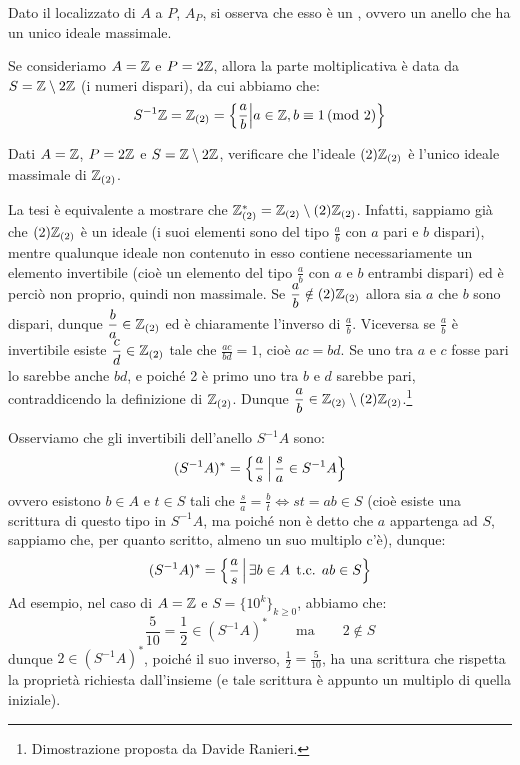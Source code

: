 \documentclass[11pt]{scrartcl}
\begin{document}
\begin{remark}
    Dato il localizzato di $A$ a $P$, $A_P$, si osserva che esso è un , ovvero un anello che ha un unico ideale massimale.
\end{remark}

\begin{example}
    Se consideriamo $A = \mathbb Z$ e $P = 2\mathbb Z$, allora la parte moltiplicativa è data da $S = \mathbb Z\setminus 2\mathbb Z$ (i numeri dispari), da cui abbiamo che:
    \[ S^{-1}\mathbb Z = \mathbb Z_{(2)} = \left\{\frac{a}{b} \middle| a \in \mathbb Z, b \equiv 1 \, \text{(mod 2)}\right\}
        \]
\end{example}

\begin{exercise}
    Dati $A = \mathbb Z$, $P = 2\mathbb Z$ e $S = \mathbb Z\setminus 2\mathbb Z$, verificare che l'ideale $(2)\mathbb Z_{(2)}$ è l'unico ideale massimale di $\mathbb Z_{(2)}$.
\end{exercise}

\begin{soln}
    La tesi è equivalente a mostrare che $\mathbb Z_{(2)}^*=\mathbb Z_{(2)}\setminus (2)\mathbb Z_{(2)}$. 
    Infatti, sappiamo già che $(2)\mathbb Z_{(2)}$ è un ideale (i suoi elementi sono del tipo $\frac{a}{b}$ con $a$ pari e $b$ dispari), 
    mentre qualunque ideale non contenuto in esso contiene necessariamente un elemento invertibile (cioè un elemento del tipo $\frac{a}{b}$ con $a$ e $b$ entrambi dispari) ed è perciò non proprio, quindi non massimale.
    Se $\displaystyle\frac{a}{b}\notin (2)\mathbb Z_{(2)}$ allora sia $a$ che $b$ sono dispari, dunque $\displaystyle\frac{b}{a}\in\mathbb Z_{(2)}$ ed è chiaramente l'inverso di $\displaystyle\frac{a}{b}$.
    Viceversa se $\displaystyle\frac{a}{b}$ è invertibile esiste $\displaystyle\frac{c}{d}\in\mathbb Z_{(2)}$ tale che $\displaystyle\frac{ac}{bd}=1$, cioè $ac=bd$. Se uno tra $a$ e $c$ fosse pari lo sarebbe
    anche $bd$, e poiché 2 è primo uno tra $b$ e $d$ sarebbe pari, contraddicendo la definizione di $\mathbb Z_{(2)}$. Dunque $\displaystyle\frac{a}{b}\in\mathbb Z_{(2)}\setminus (2)\mathbb Z_{(2)}$.\footnote{Dimostrazione proposta da Davide Ranieri.}
\end{soln}

\begin{remark}
    Osserviamo che gli invertibili dell'anello $S^{-1}A$ sono:
    \[ (S^{-1}A)^* = \left\{\frac{a}{s} \,\middle|\, \frac{s}{a} \in S^{-1}A\right\}
        \]
    ovvero esistono $b \in A$ e $t \in S$ tali che $\displaystyle \frac{s}{a} = \frac{b}{t} \iff st = ab \in S$ (cioè esiste una scrittura di questo tipo in $S^{-1}A$, ma poiché 
    non è detto che $a$ appartenga ad $S$, sappiamo che, per quanto scritto, almeno un suo multiplo c'è), dunque:
    \[ (S^{-1}A)^* = \left\{\frac{a}{s} \,\middle|\, \exists b \in A \;\, \text{t.c.} \;\, ab \in S\right\}
        \]
    Ad esempio, nel caso di $A = \mathbb Z$ e $S = \{10^k\}_{k\geq 0}$, abbiamo che:
    \[ \frac{5}{10}=\frac{1}{2} \in (S^{-1}A)^* \qquad \text{ma} \qquad 2 \not \in S
        \]
    dunque $2 \in (S^{-1}A)^*$, poiché il suo inverso, $\displaystyle \frac{1}{2} = \frac{5}{10}$, ha una scrittura che rispetta la proprietà richiesta dall'insieme (e tale scrittura è appunto un multiplo di quella iniziale).
\end{remark}
\end{document}
